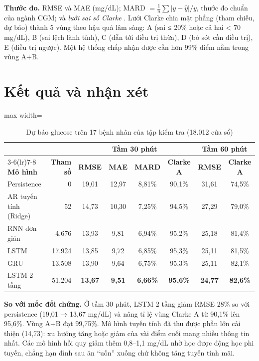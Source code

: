 \textbf{Thước đo.} RMSE và MAE (mg/dL); MARD $=\frac1n\sum|y-\hat y|/y$, thước đo chuẩn của ngành CGM; và \emph{lưới sai số Clarke} \cite{clarke1987}. Lưới Clarke chia mặt phẳng (tham chiếu, dự báo) thành 5 vùng theo hậu quả lâm sàng: A (sai ≤ 20\% hoặc cả hai < 70 mg/dL), B (sai lệch lành tính), C (dẫn tới điều trị thừa), D (bỏ sót cần điều trị), E (điều trị ngược). Một hệ thống chấp nhận được cần hơn 99\% điểm nằm trong vùng A+B.

\section{Kết quả và nhận xét}

\begin{table}[H]
\centering
\caption{Dự báo glucose trên 17 bệnh nhân của tập kiểm tra (18.012 cửa sổ)}
\label{tab:ch4-results}
\small
\begin{adjustbox}{max width=\linewidth}
\begin{tabular}{@{}lrcccccc@{}}
\toprule
 & & \multicolumn{4}{c}{\textbf{Tầm 30 phút}} & \multicolumn{2}{c}{\textbf{Tầm 60 phút}} \\
\cmidrule(lr){3-6}\cmidrule(lr){7-8}
\textbf{Mô hình} & \textbf{Tham số} & \textbf{RMSE} & \textbf{MAE} & \textbf{MARD} & \textbf{Clarke A} & \textbf{RMSE} & \textbf{Clarke A} \\
\midrule
Persistence & 0 & 19,01 & 12,97 & 8,81\% & 90,1\% & 31,61 & 74,5\% \\
AR tuyến tính (Ridge) & 52 & 14,73 & 10,30 & 7,25\% & 94,5\% & 27,29 & 79,0\% \\
RNN đơn giản & 4.676 & 13,93 & 9,81 & 6,94\% & 95,2\% & 25,18 & 81,4\% \\
LSTM & 17.924 & 13,85 & 9,72 & 6,85\% & 95,3\% & 25,11 & 81,5\% \\
GRU & 13.508 & 13,90 & 9,64 & 6,75\% & 95,3\% & 25,11 & 82,1\% \\
LSTM 2 tầng & 51.204 & \textbf{13,67} & \textbf{9,51} & \textbf{6,66\%} & \textbf{95,6\%} & \textbf{24,77} & \textbf{82,6\%} \\
\bottomrule
\end{tabular}
\end{adjustbox}
\end{table}


\textbf{So với mốc đối chứng.} Ở tầm 30 phút, LSTM 2 tầng giảm RMSE 28\% so với persistence (19,01 → 13,67 mg/dL) và nâng tỉ lệ vùng Clarke A từ 90,1\% lên 95,6\%. Vùng A+B đạt 99,75\%. Mô hình tuyến tính đã thu được phần lớn cải thiện (14,73): xu hướng tăng hoặc giảm của vài điểm cuối mang nhiều thông tin nhất. Các mô hình hồi quy giảm thêm 0,8–1,1 mg/dL nhờ học được động học phi tuyến, chẳng hạn đỉnh sau ăn ``uốn'' xuống chứ không tăng tuyến tính mãi.

